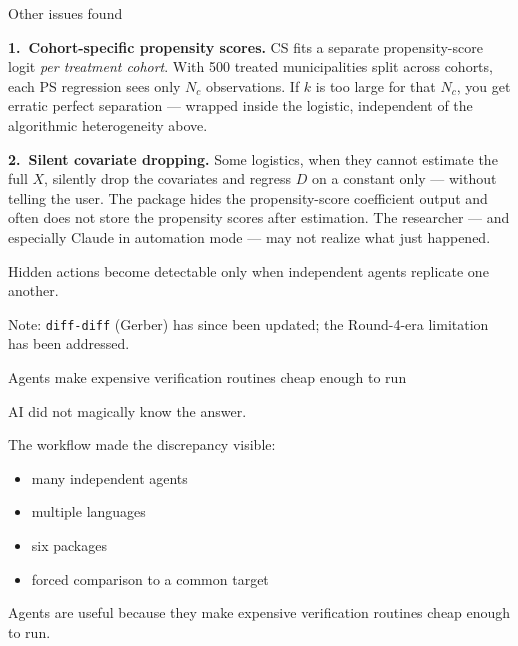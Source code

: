 \documentclass[aspectratio=169,11pt]{beamer}
\begin{document}
\begin{frame}[shrink=6]{Other issues found}

\small

\textbf{1.\ Cohort-specific propensity scores.} CS fits a separate propensity-score logit \emph{per treatment cohort}. With 500 treated municipalities split across cohorts, each PS regression sees only $N_c$ observations. If $k$ is too large for that $N_c$, you get erratic perfect separation --- wrapped inside the logistic, independent of the algorithmic heterogeneity above.

\vspace{0.3cm}

\textbf{2.\ Silent covariate dropping.} Some logistics, when they cannot estimate the full $X$, silently drop the covariates and regress $D$ on a constant only --- without telling the user. The package hides the propensity-score coefficient output and often does not store the propensity scores after estimation. The researcher --- and especially Claude in automation mode --- may not realize what just happened.

\vspace{0.3cm}

\alert{Hidden actions become detectable only when independent agents replicate one another.}

\vspace{0.1cm}

{\scriptsize\color{warmgray} Note: \texttt{diff-diff} (Gerber) has since been updated; the Round-4-era limitation has been addressed.}

\end{frame}

\begin{frame}{Agents make expensive verification routines cheap enough to run}

AI did not magically know the answer.

\vspace{0.35cm}

The workflow made the discrepancy visible:

\begin{itemize}\setlength\itemsep{0.3em}
    \item many independent agents
    \item multiple languages
    \item six packages
    \item forced comparison to a common target
\end{itemize}

\vspace{0.35cm}

\alert{Agents are useful because they make expensive verification routines cheap enough to run.}

\end{frame}
\end{document}
